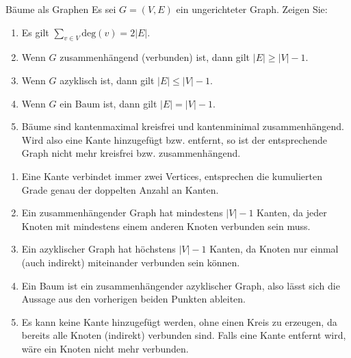 \documentclass{article}
\begin{document}
\begin{exercise}{Bäume als Graphen}
  Es sei $G = (V, E)$ ein ungerichteter Graph. Zeigen Sie:
  \begin{enumerate}
    \item Es gilt $\sum_{v \in V} \text{deg}(v) = 2|E|$.
    \item Wenn $G$ zusammenhängend (verbunden) ist, dann gilt $|E| \geq |V| - 1$.
    \item Wenn $G$ azyklisch ist, dann gilt $|E| \leq |V| - 1$.
    \item Wenn $G$ ein Baum ist, dann gilt $|E| = |V| - 1$.
    \item Bäume sind kantenmaximal kreisfrei und kantenminimal zusammenhängend. Wird also eine Kante hinzugefügt bzw. entfernt, so ist der entsprechende Graph nicht mehr kreisfrei bzw. zusammenhängend.
  \end{enumerate}

  \begin{solution}
    \begin{enumerate}
      \item Eine Kante verbindet immer zwei Vertices, entsprechen die kumulierten Grade genau der doppelten Anzahl an Kanten.
      \item Ein zusammenhängender Graph hat mindestens $|V| - 1$ Kanten, da jeder Knoten mit mindestens einem anderen Knoten verbunden sein muss.
      \item Ein azyklischer Graph hat höchstens $|V| - 1$ Kanten, da Knoten nur einmal (auch indirekt) miteinander verbunden sein können.
      \item Ein Baum ist ein zusammenhängender azyklischer Graph, also lässt sich die Aussage aus den vorherigen beiden Punkten ableiten.
      \item Es kann keine Kante hinzugefügt werden, ohne einen Kreis zu erzeugen, da bereits alle Knoten (indirekt) verbunden sind. Falls eine Kante entfernt wird, wäre ein Knoten nicht mehr verbunden.
    \end{enumerate}
  \end{solution}
\end{exercise}
\end{document}
